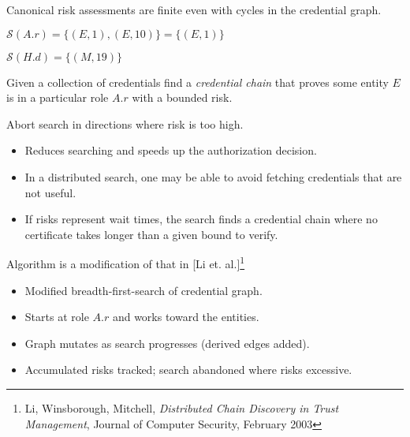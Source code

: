 \documentclass[landscape]{slides}
\begin{document}
\stopslide

Canonical risk assessments are finite even with cycles in the credential graph.


\centerline{\box\graph}

$\mathcal{S}(A.r) = \{(E, 1), (E, 10)\} = \{(E, 1)\}$
\stopslide



\centerline{\box\graph}

$\mathcal{S}(H.d) = \{(M, 19)\}$

\stopslide



Given a collection of credentials find a \textit{credential chain} that proves some entity $E$ is in a particular role $A.r$ with a bounded risk.

Abort search in directions where risk is too high.

\begin{itemize}
\item Reduces searching and speeds up the authorization decision.
\item In a distributed search, one may be able to avoid fetching credentials that are not useful.
\item If risks represent wait times, the search finds a credential chain where no certificate takes longer than a given bound to verify.
\end{itemize}

\stopslide



Algorithm is a modification of that in [Li et. al.]\footnote{Li, Winsborough, Mitchell, \textit{Distributed Chain Discovery in Trust Management}, Journal of Computer Security, February 2003}

\begin{itemize}
\item Modified breadth-first-search of credential graph.
\item Starts at role $A.r$ and works toward the entities.
\item Graph mutates as search progresses (derived edges added).
\item Accumulated risks tracked; search abandoned where risks excessive.
\end{itemize}
\end{document}
